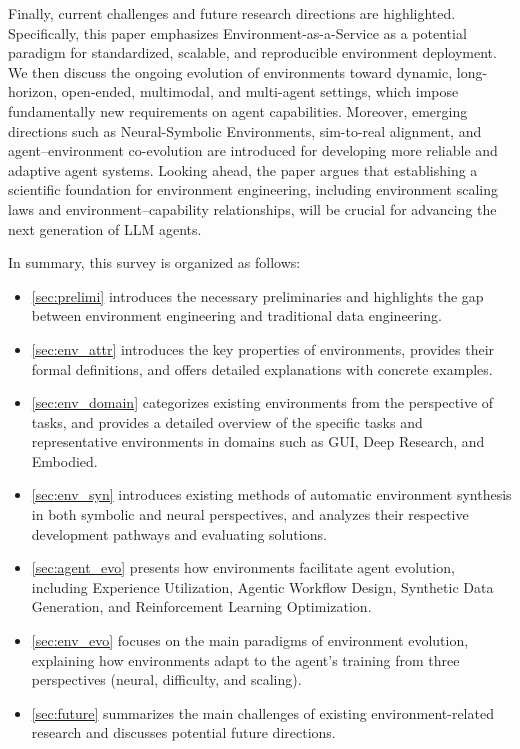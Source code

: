 Finally, current challenges and future research directions are highlighted. Specifically, this paper emphasizes Environment-as-a-Service as a potential paradigm for standardized, scalable, and reproducible environment deployment. We then discuss the ongoing evolution of environments toward dynamic, long-horizon, open-ended, multimodal, and multi-agent settings, which impose fundamentally new requirements on agent capabilities. Moreover, emerging directions such as Neural-Symbolic Environments, sim-to-real alignment, and agent–environment co-evolution are introduced for developing more reliable and adaptive agent systems. Looking ahead, the paper argues that establishing a scientific foundation for environment engineering, including environment scaling laws and environment–capability relationships, will be crucial for advancing the next generation of LLM agents.

\vspace{3pt}

In summary, this survey is organized as follows: 
\begin{itemize}
    \item \cref{sec:prelimi} introduces the necessary preliminaries and highlights the gap between environment engineering and traditional data engineering.
    \item \cref{sec:env_attr} introduces the key properties of environments, provides their formal definitions, and offers detailed explanations with concrete examples.
    \item \cref{sec:env_domain} categorizes existing environments from the perspective of tasks, and provides a detailed overview of the specific tasks and representative environments in domains such as GUI, Deep Research, and Embodied.
    \item \cref{sec:env_syn} introduces existing methods of automatic environment synthesis in both symbolic and neural perspectives, and analyzes their respective development pathways and evaluating solutions.
    \item \cref{sec:agent_evo} presents how environments facilitate agent evolution, including Experience Utilization, Agentic Workflow Design, Synthetic Data Generation, and Reinforcement Learning Optimization.
    \item \cref{sec:env_evo} focuses on the main paradigms of environment evolution, explaining how environments adapt to the agent’s training from three perspectives (neural, difficulty, and scaling).
    \item \cref{sec:future} summarizes the main challenges of existing environment-related research and discusses potential future directions.
\end{itemize}



